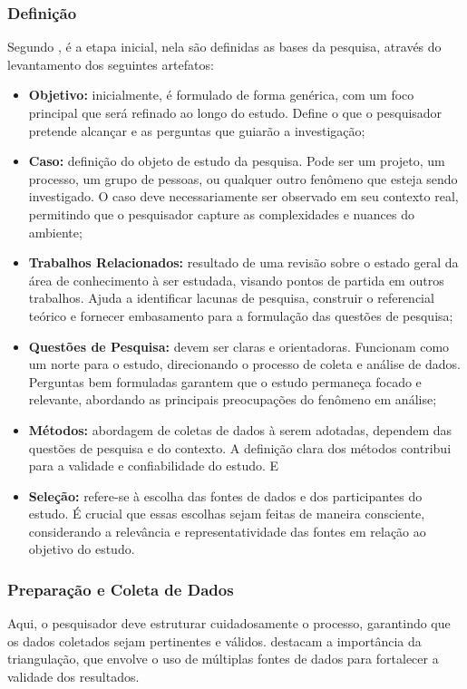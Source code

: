 \subsubsection{Definição}

Segundo , é a etapa inicial, nela são definidas as bases da pesquisa, através do levantamento dos seguintes artefatos:

\begin{itemize}
    \item \textbf{Objetivo:} inicialmente, é formulado de forma genérica, com um foco principal que será refinado ao longo do estudo. Define o que o pesquisador pretende alcançar e as perguntas que guiarão a investigação;
    \item \textbf{Caso:} definição do objeto de estudo da pesquisa. Pode ser um projeto, um processo, um grupo de pessoas, ou qualquer outro fenômeno que esteja sendo investigado. O caso deve necessariamente ser observado em seu contexto real, permitindo que o pesquisador capture as complexidades e nuances do ambiente;
    \item \textbf{Trabalhos Relacionados:} resultado de uma revisão sobre o estado geral da área de conhecimento à ser estudada, visando pontos de partida em outros trabalhos. Ajuda a identificar lacunas de pesquisa, construir o referencial teórico e fornecer embasamento para a formulação das questões de pesquisa;
    \item \textbf{Questões de Pesquisa:} devem ser claras e orientadoras. Funcionam como um norte para o estudo, direcionando o processo de coleta e análise de dados. Perguntas bem formuladas garantem que o estudo permaneça focado e relevante, abordando as principais preocupações do fenômeno em análise;
    \item \textbf{Métodos:} abordagem de coletas de dados à serem adotadas, dependem das questões de pesquisa e do contexto. A definição clara dos métodos contribui para a validade e confiabilidade do estudo. E
    \item \textbf{Seleção:} refere-se à escolha das fontes de dados e dos participantes do estudo. É crucial que essas escolhas sejam feitas de maneira consciente, considerando a relevância e representatividade das fontes em relação ao objetivo do estudo.
\end{itemize}

\subsubsection{Preparação e Coleta de Dados}
Aqui, o pesquisador deve estruturar cuidadosamente o processo, garantindo que os dados coletados sejam pertinentes e válidos.  destacam a importância da triangulação, que envolve o uso de múltiplas fontes de dados para fortalecer a validade dos resultados. 

